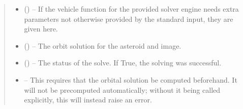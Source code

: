\documentclass[letterpaper,11pt,english]{sphinxmanual}
\begin{document}
\begin{savenotes}
\begin{fulllineitems}
\begin{savenotes}
\begin{fulllineitems}
\begin{quote}
\begin{description}
\begin{itemize}
\item {} 
\sphinxAtStartPar
{} (\sphinxstyleliteralemphasis{\sphinxupquote{, }}) – If the vehicle function for the provided solver engine needs
extra parameters not otherwise provided by the standard input,
they are given here.

\end{itemize}

\sphinxAtStartPar
\begin{itemize}
\item {} 
\sphinxAtStartPar
{} () – The orbit solution for the asteroid and image.

\item {} 
\sphinxAtStartPar
{} () – The status of the solve. If True, the solving was successful.

\item {} 
\sphinxAtStartPar
{} – This requires that the orbital solution be computed
before\sphinxhyphen{}hand. It will not be precomputed automatically; without it
being called explicitly, this will instead raise an error.

\end{itemize}


\end{description}\end{quote}

\end{fulllineitems}\end{savenotes}



\end{fulllineitems}
\end{savenotes}
\end{document}
